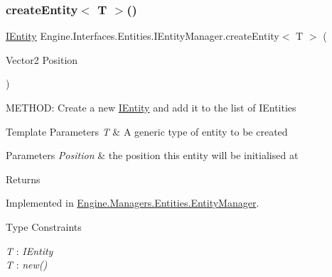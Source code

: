 \subsubsection{\texorpdfstring{create\+Entity$<$ T $>$()}{createEntity< T >()}}
{\footnotesize\ttfamily \hyperlink{a00438}{I\+Entity} Engine.\+Interfaces.\+Entities.\+I\+Entity\+Manager.\+create\+Entity$<$ T $>$ (\begin{DoxyParamCaption}\item[{Vector2}]{Position }\end{DoxyParamCaption})}



M\+E\+T\+H\+OD\+: Create a new \hyperlink{a00438}{I\+Entity} and add it to the list of I\+Entities 


\begin{DoxyTemplParams}{Template Parameters}
{\em T} & A generic type of entity to be created\\
\hline
\end{DoxyTemplParams}

\begin{DoxyParams}{Parameters}
{\em Position} & the position this entity will be initialised at\\
\hline
\end{DoxyParams}
\begin{DoxyReturn}{Returns}

\end{DoxyReturn}


Implemented in \hyperlink{a00518_a228280a4515648318fb5528936249a8b}{Engine.\+Managers.\+Entities.\+Entity\+Manager}.

\begin{Desc}
\item[Type Constraints]\begin{description}
\item[{\em T} : {\em I\+Entity}]\item[{\em T} : {\em new()}]\end{description}
\end{Desc}
\mbox{\label{a00442_aad35a164d944dcb7af20470bac0d3351}} 

